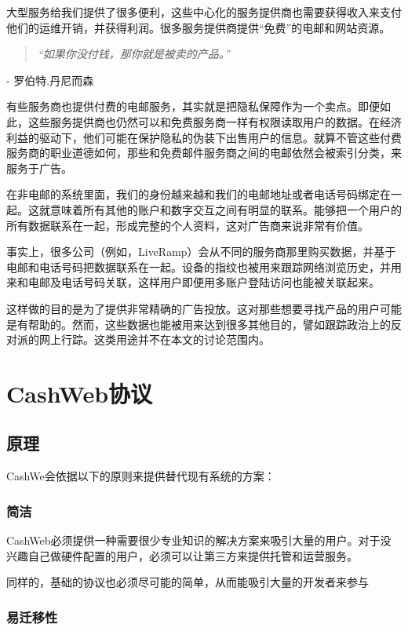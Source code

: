 \documentclass{article}
\newcommand{\chapquote}[2]{\begin{quotation} \textit{#1} \end{quotation} \begin{flushright} - #2\end{flushright} }
\begin{document}
大型服务给我们提供了很多便利，这些中心化的服务提供商也需要获得收入来支付他们的运维开销，并获得利润。很多服务提供商提供“免费”的电邮和网站资源。

\chapquote{\large ``如果你没付钱，那你就是被卖的产品。''}{罗伯特.丹尼而森}

有些服务商也提供付费的电邮服务，其实就是把隐私保障作为一个卖点。即便如此，这些服务提供商也仍然可以和免费服务商一样有权限读取用户的数据。在经济利益的驱动下，他们可能在保护隐私的伪装下出售用户的信息。就算不管这些付费服务商的职业道德如何，那些和免费邮件服务商之间的电邮依然会被索引分类，来服务于广告。

在非电邮的系统里面，我们的身份越来越和我们的电邮地址或者电话号码绑定在一起。这就意味着所有其他的账户和数字交互之间有明显的联系。能够把一个用户的所有数据联系在一起，形成完整的个人资料，这对广告商来说非常有价值。

事实上，很多公司（例如，LiveRamp）会从不同的服务商那里购买数据，并基于电邮和电话号码把数据联系在一起。设备的指纹也被用来跟踪网络浏览历史，并用来和电邮及电话号码关联，这样用户即便用多账户登陆访问也能被关联起来。

这样做的目的是为了提供非常精确的广告投放。这对那些想要寻找产品的用户可能是有帮助的。然而，这些数据也能被用来达到很多其他目的，譬如跟踪政治上的反对派的网上行踪。这类用途并不在本文的讨论范围内。

\section{CashWeb协议}

\subsection{原理}

CashWe会依据以下的原则来提供替代现有系统的方案：

\subsubsection{简洁}

CashWeb必须提供一种需要很少专业知识的解决方案来吸引大量的用户。对于没兴趣自己做硬件配置的用户，必须可以让第三方来提供托管和运营服务。

同样的，基础的协议也必须尽可能的简单，从而能吸引大量的开发者来参与

\subsubsection{易迁移性}
\end{document}
